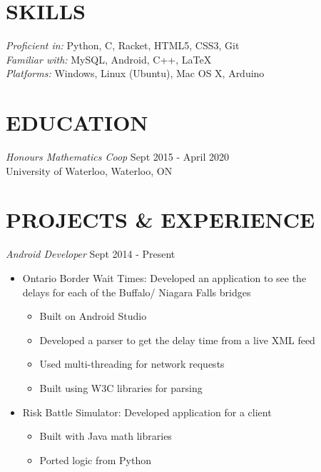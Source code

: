 \documentclass[article]{res}
\begin{document}
\begin{resume} 

\section{SKILLS} {\sl Proficient in:} Python, C, Racket, HTML5, CSS3, Git \\
{\sl Familiar with:} MySQL, Android, C++, \space \LaTeX \\
{\sl Platforms:} Windows, Linux (Ubuntu), Mac OS X, Arduino

\section{EDUCATION} {\sl Honours Mathematics Coop} \hfill Sept 2015 - April 2020   \\
                University of Waterloo, Waterloo, ON 
 
				
\section{PROJECTS \&  EXPERIENCE} {\sl Android Developer} \hfill Sept 2014 - Present                
                 \begin{itemize}  \itemsep -2pt %
                 \item Ontario Border Wait Times:
                 Developed an application to see the \\ delays for each of the Buffalo/ Niagara Falls bridges
                 	\begin{itemize} \itemsep -1pt
    				\item Built on Android Studio  
    				\item Developed a parser to get the delay time from a live  XML feed
    				\item Used multi-threading for network requests
    				\item Built using W3C libraries for parsing
					\end{itemize}
                \item Risk Battle Simulator: Developed application for a client
                	\begin{itemize}  \itemsep -1pt
                	\item Built with Java math libraries
                	\item Ported logic from Python
					\end{itemize}	                	  
                \end{itemize}
                

\end{resume}
\end{document}

